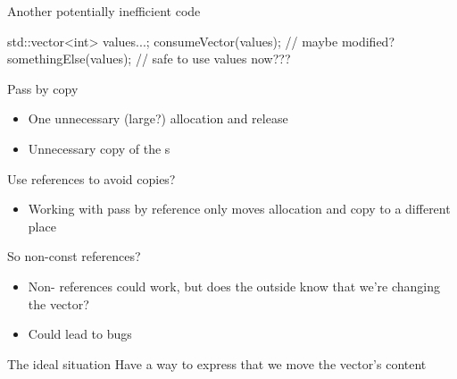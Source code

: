 \begin{frame}[fragile]
\begin{exampleblock}{Another potentially inefficient code}
\begin{overprint}
\begin{cppcode*}{}
        std::vector<int> values{...};
        consumeVector(values); // maybe modified?
        somethingElse(values); // safe to use values now???
      \end{cppcode*}
    \end{overprint}
  \end{exampleblock}
  \begin{overprint}
    \begin{alertblock}{Pass by copy}
      \begin{itemize}
      \item One unnecessary (large?) allocation and release
      \item Unnecessary copy of the s
      \end{itemize}
    \end{alertblock}
    \begin{alertblock}{Use references to avoid copies?}
      \begin{itemize}
      \item Working with pass by reference only moves allocation and copy to a different place
      \end{itemize}
    \end{alertblock}
    \begin{alertblock}{So non-const references?}
      \begin{itemize}
      \item Non- references could work, but does the outside know that we're changing the vector?
      \item Could lead to bugs
      \end{itemize}
    \end{alertblock}
    \begin{block}{The ideal situation}
      Have a way to express that we move the vector's content
    \end{block}
  \end{overprint}
\end{frame}

